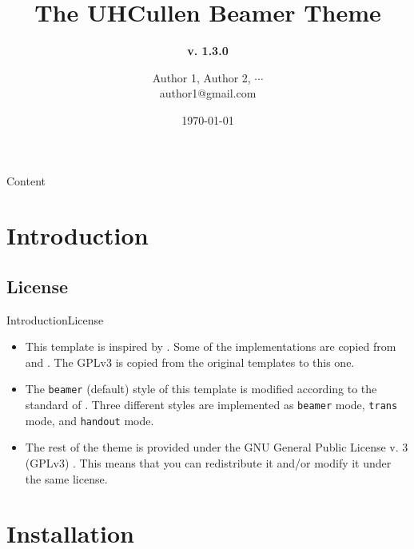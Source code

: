\documentclass[10pt,xcolor={dvipsnames},aspectratio=169]{beamer}
\title[UHCullen Theme]
{ %
  \textbf{The UHCullen Beamer Theme}
}
\subtitle[v. 1.3.0]
{
\textbf{v. 1.3.0}
}
\author[Author 1]
{Author 1\texorpdfstring{\footnotemark[1]}{},
Author 2\texorpdfstring{\footnotemark[2]}{},
\texorpdfstring{$\cdots$}{...}
\texorpdfstring{ \\
  {\ttfamily author1@gmail.com}
}{}}
\institute[]
{%
  \footnotemark[1]Affiliation 1\\
  \footnotemark[2]Affiliation 2
}
\date{\today} %
\begin{document}

\titleframe

\begin{frame}{Content}{}
\tableofcontents
\end{frame}

\section{Introduction}
\subsection{License}
\begin{frame}{Introduction}{License}

  \begin{itemize}
    \item<1-> This template is inspired by . Some of the implementations are copied from  and . The GPLv3 is copied from the original templates to this one.
    \item<2-> The \texttt{beamer} (default) style of this template is modified according to the standard of . Three different styles are implemented as \texttt{beamer} mode, \texttt{trans} mode, and \texttt{handout} mode.
    \item<3-> The rest of the theme is provided under the GNU General Public License v. 3 (GPLv3) . This means that you can redistribute it and/or modify it under the same license. 
  \end{itemize}
\end{frame}

\section{Installation}
\end{document}
